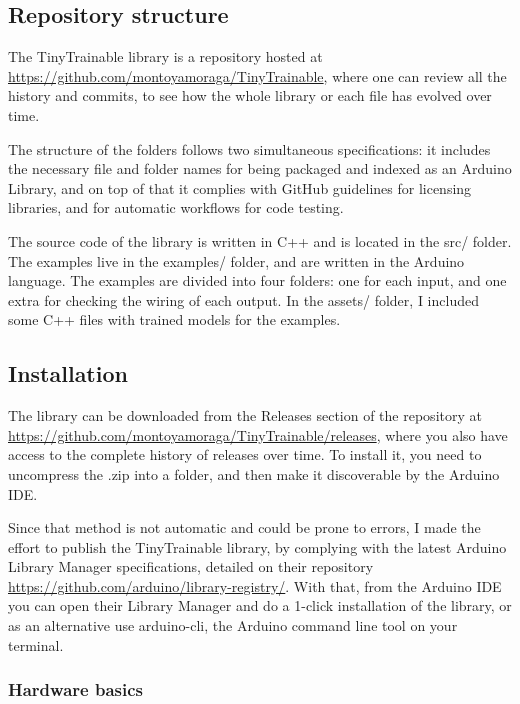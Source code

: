 \subsection{Repository structure}

The TinyTrainable library is a repository hosted at \url{https://github.com/montoyamoraga/TinyTrainable}, where one can review all the history and \glspl{commit}, to see how the whole library or each file has evolved over time.

The structure of the folders follows two simultaneous specifications: it includes the necessary file and folder names for being packaged and indexed as an Arduino Library, and on top of that it complies with GitHub guidelines for licensing libraries, and for automatic workflows for code testing.

The source code of the library is written in C++ and is located in the src/ folder. The examples live in the examples/ folder, and are written in the Arduino language. The examples are divided into four folders: one for each input, and one extra for checking the wiring of each output. In the assets/ folder, I included some C++ files with trained models for the examples.

\subsection{Installation}

The library can be downloaded from the Releases section of the repository at  \url{https://github.com/montoyamoraga/TinyTrainable/releases}, where you also have access to the complete history of releases over time. To install it, you need to uncompress the .zip into a folder, and then make it discoverable by the Arduino \acrfull{IDE}.

Since that method is not automatic and could be prone to errors, I made the effort to publish the TinyTrainable library, by complying with the latest Arduino Library Manager specifications, detailed on their repository \url{https://github.com/arduino/library-registry/}. With that, from the Arduino \acrshort{IDE} you can open their Library Manager and do a 1-click installation of the library, or as an alternative use arduino-cli, the Arduino command line tool on your terminal.

\subsubsection{Hardware basics}

